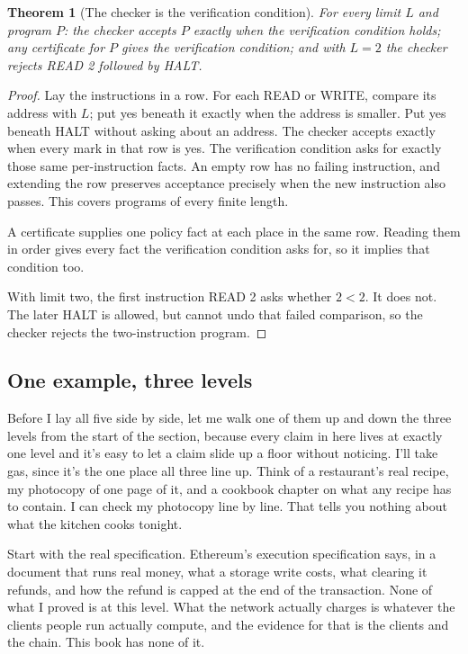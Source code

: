 \documentclass[11pt,twoside]{article}
\theoremstyle{thielethm}
\newtheorem{theorem}{Theorem}[section]
\theoremstyle{thieledef}
\theoremstyle{thieledef}
\theoremstyle{thieledef}
\theoremstyle{thielethm}
\theoremstyle{thieleobs}
\theoremstyle{thielethm}
\begin{document}
\begin{theorem}[The checker is the verification condition]\label{thm:u13-pcc}
For every limit $L$ and program $P$: the checker accepts $P$ exactly when the verification
condition holds; any certificate for $P$ gives the verification condition; and with $L = 2$
the checker rejects READ 2 followed by HALT.
\end{theorem}

\begin{proof}
Lay the instructions in a row. For each READ or WRITE, compare its address
with $L$; put yes beneath it exactly when the address is smaller. Put yes
beneath HALT without asking about an address. The checker accepts exactly
when every mark in that row is yes. The verification condition asks for
exactly those same per-instruction facts. An empty row has no failing
instruction, and extending the row preserves acceptance precisely when
the new instruction also passes. This covers programs of every finite length.

A certificate supplies one policy fact at each place in the same row.
Reading them in order gives every fact the verification condition asks
for, so it implies that condition too.

With limit two, the first instruction READ 2 asks whether $2<2$. It does
not. The later HALT is allowed, but cannot undo that failed comparison,
so the checker rejects the two-instruction program.
\end{proof}


\subsection{One example, three levels}

Before I lay all five side by side, let me walk one of them up and down the three levels from
the start of the section, because every claim in here lives at exactly one level and it's
easy to let a claim slide up a floor without noticing. I'll take gas, since it's the one place all
three line up. Think of a restaurant's real recipe, my photocopy of one page of it, and a
cookbook chapter on what any recipe has to contain. I can check my photocopy line by line.
That tells you nothing about what the kitchen cooks tonight.

Start with the real specification. Ethereum's execution specification says, in a document that runs real
money, what a storage write costs, what clearing it refunds, and how the refund is capped at
the end of the transaction. None of what I proved is at this level. What the network
actually charges is whatever the clients people run actually compute, and the evidence for
that is the clients and the chain. This book has none of it.
\end{document}
